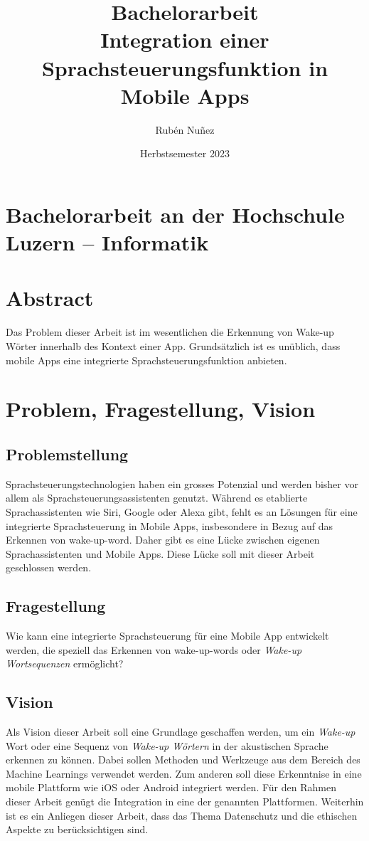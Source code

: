 \documentclass[11pt,a4paper]{article}
\title{
{\LARGE Bachelorarbeit}\\[2em]
{\textbf{Integration einer Sprachsteuerungsfunktion {\break} in Mobile Apps}}
}
\author{Rubén Nuñez}
\date{Herbstsemester 2023}
\begin{document}
\maketitle
\thispagestyle{empty} %
\newpage

\section*{Bachelorarbeit an der Hochschule Luzern -- Informatik}

\newpage

\newpage \section*{Abstract}
Das Problem dieser Arbeit ist im wesentlichen die Erkennung von Wake-up Wörter innerhalb
des Kontext einer App. Grundsätzlich ist es unüblich, dass mobile Apps eine
integrierte Sprachsteuerungsfunktion anbieten. 


\newpage
\tableofcontents

\newpage

\newpage \section{Problem, Fragestellung, Vision}
\subsection{Problemstellung}
Sprachsteuerungstechnologien haben ein grosses Potenzial und werden bisher vor allem als 
Sprachsteuerungsassistenten genutzt. Während es etablierte Sprachassistenten wie Siri, Google 
oder Alexa gibt, fehlt es an Lösungen für eine integrierte Sprachsteuerung in Mobile Apps, 
insbesondere in Bezug auf das Erkennen von \gls{wake-up-word}. Daher gibt es eine Lücke
zwischen eigenen Sprachassistenten und Mobile Apps. Diese Lücke soll mit dieser Arbeit 
geschlossen werden.

\subsection{Fragestellung}
Wie kann eine integrierte Sprachsteuerung für eine Mobile App entwickelt werden, die speziell 
das Erkennen von \glspl{wake-up-word} oder \textit{Wake-up Wortsequenzen} ermöglicht?


\subsection{Vision}
Als Vision dieser Arbeit soll eine Grundlage geschaffen werden, um ein \textit{Wake-up} Wort 
oder eine Sequenz von \textit{Wake-up Wörtern} in der akustischen Sprache erkennen zu können.
Dabei sollen Methoden und Werkzeuge aus dem Bereich des Machine Learnings verwendet werden.
Zum anderen soll diese Erkenntnise in eine mobile Plattform wie iOS oder Android integriert 
werden. Für den Rahmen dieser Arbeit genügt die Integration in eine der genannten Plattformen. 
Weiterhin ist es ein Anliegen dieser Arbeit, dass das Thema Datenschutz und die ethischen Aspekte 
zu berücksichtigen sind.
\end{document}

